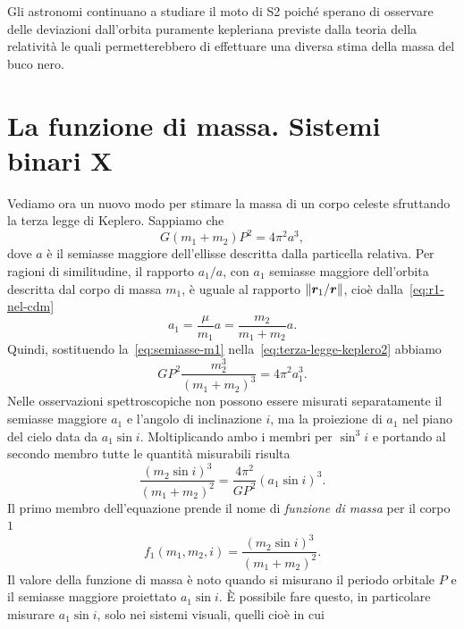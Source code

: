 Gli astronomi continuano a studiare il moto di S2 poiché sperano di osservare
delle deviazioni dall'orbita puramente kepleriana previste dalla teoria della
relatività le quali permetterebbero di effettuare una diversa stima della massa
del buco nero.

\section{La funzione di massa. Sistemi binari X}
\label{sec:funzione-massa}

Vediamo ora un nuovo modo per stimare la massa di un corpo celeste sfruttando la
terza legge di Keplero. Sappiamo che
\begin{equation}
  \label{eq:terza-legge-keplero2}
  G(m_1 + m_2)  P^2 = 4\pi^2a^3,
\end{equation}
dove $a$ è il semiasse maggiore dell'ellisse descritta dalla particella
relativa. Per ragioni di similitudine, il rapporto $a_1/a$, con $a_1$ semiasse
maggiore dell'orbita descritta dal corpo di massa $m_1$, è uguale al rapporto
$\lVert\bm{r}_1/\bm{r}\rVert$, cioè dalla~\eqref{eq:r1-nel-cdm}
\begin{equation}
  \label{eq:semiasse-m1}
  a_1 = \frac{\mu}{m_1}a = \frac{m_2}{m_1 + m_2}a.
\end{equation}
Quindi, sostituendo la~\eqref{eq:semiasse-m1}
nella~\eqref{eq:terza-legge-keplero2} abbiamo
\begin{equation}
  GP^2\frac{m_2^3}{(m_1 + m_2)^3} = 4\pi^2a_1^3.
\end{equation}
Nelle osservazioni spettroscopiche non possono essere misurati separatamente il
semiasse maggiore $a_1$ e l'angolo di inclinazione $i$, ma la proiezione di
$a_1$ nel piano del cielo data da $a_1\sin i$. Moltiplicando ambo i membri per
$\sin^3 i$ e portando al secondo membro tutte le quantità misurabili risulta
\begin{equation}
  \label{eq:valore-funzione-massa}
  \frac{(m_2\sin i)^3}{(m_1 + m_2)^2} = \frac{4\pi^2}{GP^2}(a_1\sin i)^3.
\end{equation}
Il primo membro dell'equazione prende il nome di \emph{funzione di massa} per il
corpo $1$
\begin{equation}
  f_1(m_1,m_2,i) = \frac{(m_2\sin i)^3}{(m_1 + m_2)^2}.
\end{equation}
Il valore della funzione di massa è noto quando si misurano il periodo orbitale
$P$ e il semiasse maggiore proiettato $a_1\sin i$. È possibile fare questo, in
particolare misurare $a_1\sin i$, solo nei sistemi visuali, quelli cioè in cui
